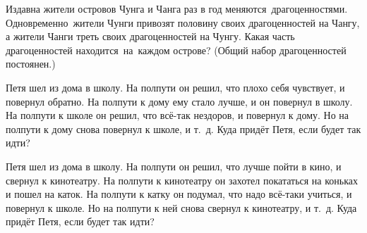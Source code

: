 \documentclass[a4paper, 12pt]{article}
\begin{document}



Издавна жители островов Чунга и Чанга раз в год
меняются~драгоцен\-ностями. Одновременно~жители Чунги привозят
половину своих драгоценностей на Чангу, а жители
Чанги %
треть своих драгоценностей на
Чунгу.
Какая часть драгоценностей находится~на~каж\-дом острове?
(Общий набор драгоценностей постоянен.) %




 Петя шел из дома в школу.
На полпути он решил, что плохо себя чувствует, и
повернул обратно. На полпути к дому ему стало лучше,
и он повернул в школу. На полпути к школе он решил, что
всё-так нездоров, и повернул к дому. Но на полпути
к дому снова повернул к школе, и т.~д. Куда
прид\"ет Петя, если будет так идти?



 Петя шел из дома в школу.
На полпути он решил, что лучше пойти в кино, и
свернул к кинотеатру. На полпути к кинотеатру
он захотел покататься на коньках и пошел на каток.
На полпути к катку он подумал, что надо вс\"е-таки
учиться, и повернул к школе. Но на полпути
к ней снова свернул к кинотеатру, и т.~д. Куда
прид\"ет Петя, если будет так идти?





\end{document}
